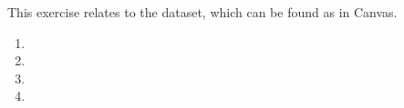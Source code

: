 This exercise relates to the  dataset, which can be found as  in Canvas.
\begin{enumerate}
    \item 
    \item \newpage
    \item \newpage
    \item 
\end{enumerate}